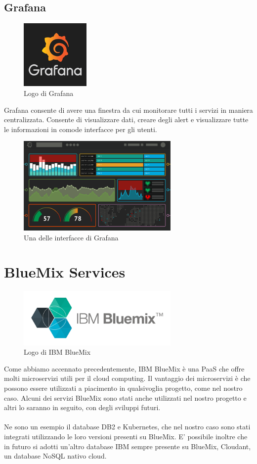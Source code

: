 \subsection{Grafana}
\begin{figure}[h!]
	\centering
	\includegraphics[width=0.3\textwidth,keepaspectratio=true]{capitoli/imgs/grafanalogo.png}
	\caption{Logo di Grafana}
\end{figure}
Grafana consente di avere una finestra da cui monitorare tutti i servizi in maniera centralizzata. Consente di visualizzare dati, creare degli alert e visualizzare tutte le informazioni in comode interfacce per gli utenti.
\begin{figure}[h!]
	\centering
	\includegraphics[width=0.7\textwidth,keepaspectratio=true]{capitoli/imgs/grafanainterface.PNG}
	\caption{Una delle interfacce di Grafana}
\end{figure}
\section{BlueMix Services}
\begin{figure}[h!]
	\centering
	\includegraphics[width=0.7\textwidth,keepaspectratio=true]{capitoli/imgs/bluemixlogo.png}
	\caption{Logo di IBM BlueMix}
\end{figure}
Come abbiamo accennato precedentemente, IBM BlueMix è una PaaS che offre molti microservizi utili per il cloud computing. Il vantaggio dei microservizi è che possono essere utilizzati a piacimento in qualsivoglia progetto, come nel nostro caso. Alcuni dei servizi BlueMix sono stati anche utilizzati nel nostro progetto e altri lo saranno in seguito, con degli sviluppi futuri.
\paragraph{}
Ne sono un esempio il database DB2 e Kubernetes, che nel nostro caso sono stati integrati utilizzando le loro versioni presenti su BlueMix. E' possibile inoltre che in futuro si adotti un'altro database IBM sempre presente su BlueMix, Cloudant, un database NoSQL nativo cloud.
